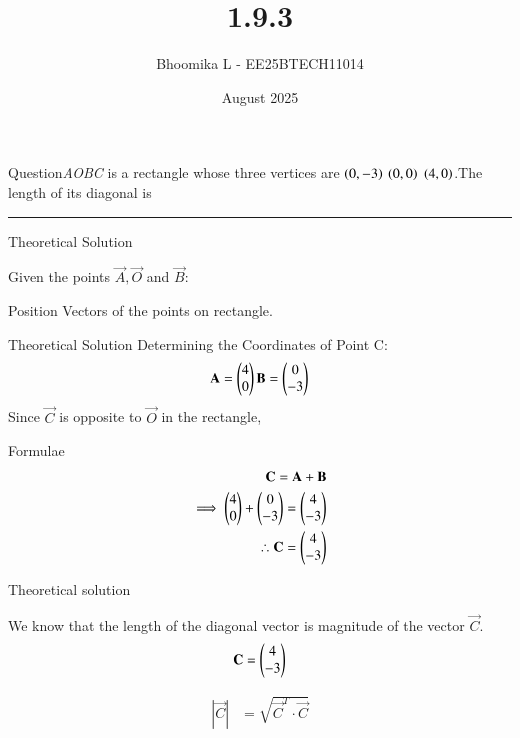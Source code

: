 \documentclass{beamer}
\title %
{1.9.3}
\date{August  2025}
\author %
{Bhoomika L - EE25BTECH11014}
\begin{document}
\frame{\titlepage}
\begin{frame}{Question}\textit{AOBC} is a rectangle whose three vertices are $\left(0,-3\right)$ $\left(0,0\right)$ $\left(4,0\right)$.The length of its diagonal is\rule{2cm}{0.4pt}
\end{frame}

\begin{frame}{Theoretical Solution}

 Given the points $\vec{A},\vec{O}$ and $\vec{B}:$\\
\begin{table}[H]    
  \centering
  
  \caption{Position Vectors of the points on rectangle.}
  \label{tab:1.9.3}
\end{table}

\end{frame}


\begin{frame}{Theoretical Solution}
Determining the Coordinates of Point C:
\begin{align}
 \mathbf{A} = \begin{pmatrix}4\\0 \end{pmatrix}
 \mathbf{B} = \begin{pmatrix}0\\-3\end{pmatrix}
\end{align}
 Since $\vec{C}$ is opposite to $\vec{O}$ in the rectangle,
\end{frame}

\begin{frame}{Formulae}
\begin{align}
\mathbf{C} = \mathbf{A} + \mathbf{B}
\\
\implies \begin{pmatrix}4\\0\end{pmatrix}+ \begin{pmatrix}0\\-3\end{pmatrix}=\begin{pmatrix}4\\-3\end{pmatrix}\\
\therefore \mathbf{C}=\begin{pmatrix}4\\-3\end{pmatrix}
\end{align}
\end{frame}

\begin{frame}{Theoretical solution}

We know that the length of the diagonal vector is magnitude of the vector $\vec{C}$.\\

\begin{align}
\mathbf{C}= \begin{pmatrix}4 \\ -3\end{pmatrix} 
\end{align}


\begin{align}
\left|\vec{C} \right| &= \sqrt{ \vec{C}^T \cdot \vec{C}}
 \end{align}
    
\end{frame}
\end{document}
